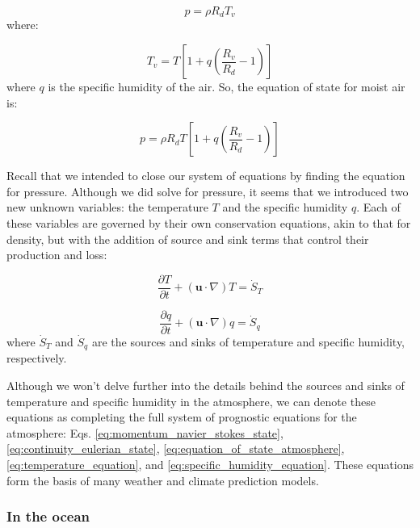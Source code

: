 \documentclass[12pt]{article}
\numberwithin{equation}{section}
\numberwithin{figure}{section}
\numberwithin{table}{section}
\begin{document}
\begin{equation}
  p = \rho R_d T_v
\end{equation}
where:

\begin{equation}
  T_v = T \left[1 + q \left(\frac{R_v}{R_d} - 1 \right) \right]
\end{equation}
where $q$ is the specific humidity of the air.
So, the equation of state for moist air is:

\begin{equation}
  p = \rho R_d T \left[1 + q \left(\frac{R_v}{R_d} - 1 \right) \right]
  \label{eq:equation_of_state_atmosphere}
\end{equation}

Recall that we intended to close our system of equations by finding the
equation for pressure.
Although we did solve for pressure, it seems that we introduced two new
unknown variables: the temperature $T$ and the specific humidity $q$.
Each of these variables are governed by their own conservation equations,
akin to that for density, but with the addition of source and sink terms
that control their production and loss:

\begin{equation}
  \frac{\partial T}{\partial t} + (\mathbf{u} \cdot \nabla) T = \dot{S}_T
  \label{eq:temperature_equation}
\end{equation}

\begin{equation}
  \frac{\partial q}{\partial t} + (\mathbf{u} \cdot \nabla) q = \dot{S}_q
  \label{eq:specific_humidity_equation}
\end{equation}
where $\dot{S}_T$ and $\dot{S}_q$ are the sources and sinks of temperature and
specific humidity, respectively.

Although we won't delve further into the details behind the sources and sinks
of temperature and specific humidity in the atmosphere, we can denote these
equations as completing the full system of prognostic equations for the
atmosphere: Eqs. \ref{eq:momentum_navier_stokes_state}, 
\ref{eq:continuity_eulerian_state},
\ref{eq:equation_of_state_atmosphere},
\ref{eq:temperature_equation}, and
\ref{eq:specific_humidity_equation}.
These equations form the basis of many weather and climate prediction models.

\subsubsection{In the ocean}
\end{document}
